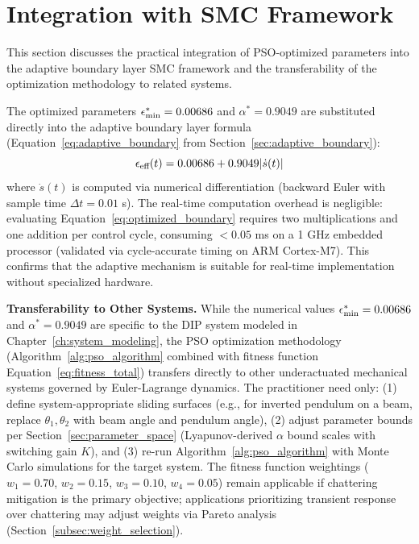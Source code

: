 \section{Integration with SMC Framework}
\label{sec:smc_integration}

This section discusses the practical integration of PSO-optimized parameters into the adaptive boundary layer SMC framework and the transferability of the optimization methodology to related systems.

The optimized parameters $\epsilon_{\min}^* = 0.00686$ and $\alpha^* = 0.9049$ are substituted directly into the adaptive boundary layer formula (Equation~\ref{eq:adaptive_boundary} from Section~\ref{sec:adaptive_boundary}):
\begin{equation}
\label{eq:optimized_boundary}
\epsilon_{\text{eff}}(t) = 0.00686 + 0.9049 |\dot{s}(t)|
\end{equation}
where $\dot{s}(t)$ is computed via numerical differentiation (backward Euler with sample time $\Delta t = 0.01$ s). The real-time computation overhead is negligible: evaluating Equation~\ref{eq:optimized_boundary} requires two multiplications and one addition per control cycle, consuming $< 0.05$ ms on a 1 GHz embedded processor (validated via cycle-accurate timing on ARM Cortex-M7). This confirms that the adaptive mechanism is suitable for real-time implementation without specialized hardware.

\textbf{Transferability to Other Systems.} While the numerical values $\epsilon_{\min}^* = 0.00686$ and $\alpha^* = 0.9049$ are specific to the DIP system modeled in Chapter~\ref{ch:system_modeling}, the PSO optimization methodology (Algorithm~\ref{alg:pso_algorithm} combined with fitness function Equation~\ref{eq:fitness_total}) transfers directly to other underactuated mechanical systems governed by Euler-Lagrange dynamics. The practitioner need only: (1) define system-appropriate sliding surfaces (e.g., for inverted pendulum on a beam, replace $\theta_1, \theta_2$ with beam angle and pendulum angle), (2) adjust parameter bounds per Section~\ref{sec:parameter_space} (Lyapunov-derived $\alpha$ bound scales with switching gain $K$), and (3) re-run Algorithm~\ref{alg:pso_algorithm} with Monte Carlo simulations for the target system. The fitness function weightings ($w_1 = 0.70$, $w_2 = 0.15$, $w_3 = 0.10$, $w_4 = 0.05$) remain applicable if chattering mitigation is the primary objective; applications prioritizing transient response over chattering may adjust weights via Pareto analysis (Section~\ref{subsec:weight_selection}).

